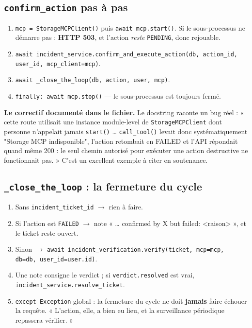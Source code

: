 \documentclass[11pt,a4paper]{report}
\newcommand{\fn}[1]{\texttt{\small\textcolor{oasisviolet}{#1}}}
\newcommand{\cls}[1]{\texttt{\small\textcolor{oasisblue}{#1}}}
\newcommand{\arrowto}{\ensuremath{\rightarrow}}
\begin{document}
\subsection*{\fn{confirm\_action} pas à pas}

\begin{enumerate}
  \item \texttt{mcp = StorageMCPClient()} puis \texttt{await mcp.start()}. Si le
  sous-processus ne démarre pas : \textbf{HTTP 503}, et l'action \emph{reste}
  \texttt{PENDING}, donc rejouable.
  \item \fn{await incident\_service.confirm\_and\_execute\_action(db,
  action\_id, user\_id, mcp\_client=mcp)}.
  \item \fn{await \_close\_the\_loop(db, action, user, mcp)}.
  \item \texttt{finally: await mcp.stop()} --- le sous-processus est toujours
  fermé.
\end{enumerate}

\begin{keybox}
\textbf{Le correctif documenté dans le fichier.} Le docstring raconte un bug
réel : « cette route utilisait une instance module-level de
\cls{StorageMCPClient} dont personne n'appelait jamais \fn{start()} \ldots{}
\fn{call\_tool()} levait donc systématiquement "Storage MCP indisponible",
l'action retombait en FAILED et l'API répondait quand même 200 : le seul chemin
autorisé pour exécuter une action destructive ne fonctionnait pas. »
C'est un excellent exemple à citer en soutenance.
\end{keybox}

\subsection*{\fn{\_close\_the\_loop} : la fermeture du cycle}

\begin{enumerate}
  \item Sans \texttt{incident\_ticket\_id} \arrowto{} rien à faire.
  \item Si l'action est \texttt{FAILED} \arrowto{} note
  « \ldots{} confirmed by X but failed: <raison> », et le ticket reste ouvert.
  \item Sinon \arrowto{} \fn{await incident\_verification.verify(ticket,
  mcp=mcp, db=db, user\_id=user.id)}.
  \item Une note consigne le verdict ; si \texttt{verdict.resolved} est vrai,
  \fn{incident\_service.resolve\_ticket}.
  \item \texttt{except Exception} global : la fermeture du cycle ne doit
  \textbf{jamais} faire échouer la requête. « L'action, elle, a bien eu lieu, et
  la surveillance périodique repassera vérifier. »
\end{enumerate}
\end{document}
